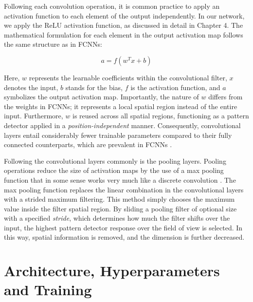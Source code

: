 \documentclass[a4paper, UKenglish, 11pt]{uiomaster}
\begin{document}
Following each convolution operation, it is common practice to apply an activation function to each element of the output independently. In our network, we apply the ReLU activation function, as discussed in detail in Chapter 4. The mathematical formulation for each element in the output activation map follows the same structure as in FCNNs:

\begin{equation}
a = f(w^{T}x + b)
\end{equation}

Here, $w$ represents the learnable coefficients within the convolutional filter, $x$ denotes the input, $b$ stands for the bias, $f$ is the activation function, and $a$ symbolizes the output activation map. Importantly, the nature of $w$ differs from the weights in FCNNs; it represents a local spatial region instead of the entire input. Furthermore, $w$ is reused across all spatial regions, functioning as a pattern detector applied in a \emph{position-independent} manner. Consequently, convolutional layers entail considerably fewer trainable parameters compared to their fully connected counterparts, which are prevalent in FCNNs \cite{IN5400-Lecture3}.

Following the convolutional layers commonly is the pooling layers. Pooling operations reduce the size of activation maps by the use of a max pooling function that in some sense works very much like a discrete convolution \cite{dumoulin2018}. The max pooling function replaces the linear combination in the convolutional layers with a strided maximum filtering. This method simply chooses the maximum value inside the filter spatial region. By sliding a pooling filter of optional size with a specified \emph{stride}, which determines how much the filter shifts over the input, the highest pattern detector response over the field of view is selected. In this way, spatial information is removed, and the dimension is further decreased.


\section{Architecture, Hyperparameters and Training}
\end{document}
